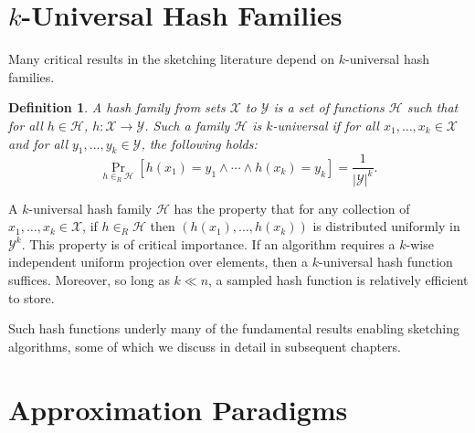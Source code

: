 \documentclass[10]{report}
\newtheorem{definition}{Definition}[section]
\begin{document}
\section{$k$-Universal Hash Families} \label{sec:hashing}

Many critical results in the sketching literature depend on $k$-universal hash families. 
%
\begin{definition}
A hash family from sets $\mathcal{X}$ to $\mathcal{Y}$ is a set of functions $\mathcal{H}$ such that for all $h \in \mathcal{H}$, $h: \mathcal{X} \rightarrow \mathcal{Y}$.
Such a family $\mathcal{H}$ is $k$-universal if for all $x_1, \dots, x_k \in \mathcal{X}$ and for all $y_1, \dots, y_k \in \mathcal{Y}$, the following holds:
\begin{equation*}
\Pr_{h \in_R \mathcal{H}} \left [ h(x_1) = y_1 \wedge \cdots \wedge h(x_k) = y_k \right ] = \frac{1}{|\mathcal{Y}|^k}.
\end{equation*}
\end{definition}
%
A $k$-universal hash family $\mathcal{H}$ has the property that for any collection of $x_1, \dots, x_k \in \mathcal{X}$, if $h \in_R \mathcal{H}$ then $(h(x_1), \dots, h(x_k))$ is distributed uniformly in $\mathcal{Y}^k$. 
This property is of critical importance.
If an algorithm requires a $k$-wise independent uniform projection over elements, then a $k$-universal hash function suffices.
Moreover, so long as $k \ll n$, a sampled hash function is relatively efficient to store. 

Such hash functions underly many of the fundamental results enabling sketching algorithms, some of which we discuss in detail in subsequent chapters.


















\section{Approximation Paradigms} \label{sec:approx}
\end{document}

